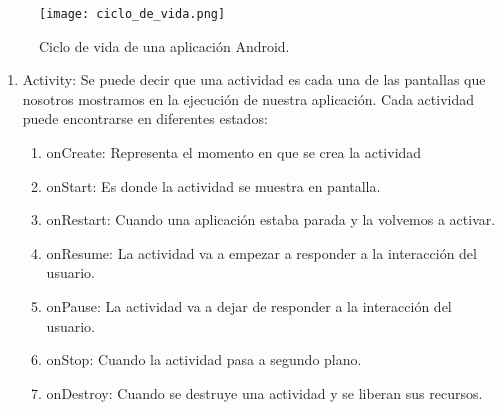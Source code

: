 \begin{figure}[h]
\texttt{[image: ciclo\_de\_vida.png]} 
\caption{Ciclo de vida de una aplicación Android.}
\end{figure}
\begin{enumerate}

\item	Activity: Se puede decir que una actividad es cada una de
 las pantallas que nosotros mostramos en la ejecución de nuestra 
aplicación. Cada actividad puede encontrarse en diferentes estados:
\begin{enumerate}
\item	onCreate: Representa el momento en que se crea la actividad
\item	onStart: Es donde la actividad se muestra en pantalla.
\item	onRestart: Cuando una aplicación estaba parada y la volvemos a activar.
\item	onResume: La actividad va a empezar a responder a la interacción del usuario.
\item	onPause: La actividad va a dejar de responder a la interacción del usuario.
\item	onStop: Cuando la actividad pasa a segundo plano.
\item	onDestroy: Cuando se destruye una actividad y se liberan sus recursos.
\end{enumerate}





\end{enumerate}
